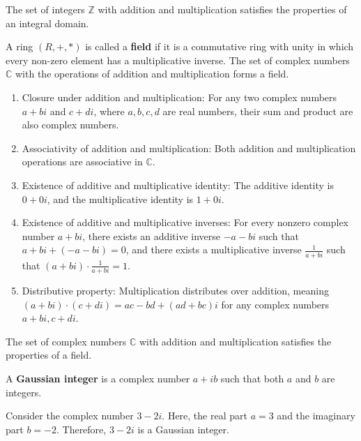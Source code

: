 \begin{example}
    The set of integers \(\mathbb{Z}\) with addition and multiplication satisfies the properties of an integral domain.

\end{example} 
\begin{definition}
A ring \((R,+,*)\) is called a \textbf{field} if it is a commutative ring with unity in which every non-zero element has a multiplicative inverse.
The set of complex numbers \(\mathbb{C}\) with the operations of addition and multiplication forms a field.
\begin{enumerate}
    \item Closure under addition and multiplication: For any two complex numbers \(a + bi\) and \(c + di\), where \(a, b, c, d\) are real numbers, their sum and product are also complex numbers.
    \item Associativity of addition and multiplication: Both addition and multiplication operations are associative in \(\mathbb{C}\).
    \item Existence of additive and multiplicative identity: The additive identity is \(0 + 0i\), and the multiplicative identity is \(1 + 0i\).
    \item Existence of additive and multiplicative inverses: For every nonzero complex number \(a + bi\), there exists an additive inverse \(-a - bi\) such that \(a + bi + (-a - bi) = 0\), and there exists a multiplicative inverse \(\frac{1}{a + bi}\) such that \((a + bi) \cdot \frac{1}{a + bi} = 1\).
    \item Distributive property: Multiplication distributes over addition, meaning \((a + bi) \cdot (c + di) = ac - bd + (ad + bc)i\) for any complex numbers \(a + bi, c + di\).
\end{enumerate}
\end{definition}
\begin{example}
    The set of complex numbers \(\mathbb{C}\) with addition and multiplication satisfies the properties of a field.

\end{example}
\begin{definition}
 A \textbf{Gaussian integer} is a complex number $a + ib$ such that both $a$ and $b$ are integers.
\end{definition}

\begin{example}
Consider the complex number $3 - 2i$. Here, the real part $a = 3$ and the imaginary part $b = -2$. Therefore, $3 - 2i$ is a Gaussian integer.
\end{example}




